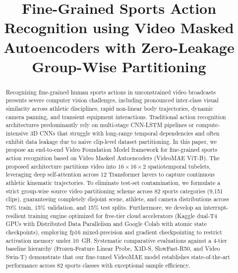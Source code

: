 \documentclass[conference]{IEEEtran}
\begin{document}
\title{Fine-Grained Sports Action Recognition using Video Masked Autoencoders with Zero-Leakage Group-Wise Partitioning}

\author{
}

\maketitle

\begin{abstract}
Recognizing fine-grained human sports actions in unconstrained video broadcasts presents severe computer vision challenges, including pronounced inter-class visual similarity across athletic disciplines, rapid non-linear body trajectories, dynamic camera panning, and transient equipment interactions. Traditional action recognition architectures predominantly rely on multi-stage CNN-LSTM pipelines or compute-intensive 3D CNNs that struggle with long-range temporal dependencies and often exhibit data leakage due to naive clip-level dataset partitioning. In this paper, we propose an end-to-end Video Foundation Model framework for fine-grained sports action recognition based on Video Masked Autoencoders (VideoMAE ViT-B). The proposed architecture partitions video into $16 \times 16 \times 2$ spatiotemporal tubelets, leveraging deep self-attention across 12 Transformer layers to capture continuous athletic kinematic trajectories. To eliminate test-set contamination, we formulate a strict group-wise source video partitioning scheme across 82 sports categories (9,151 clips), guaranteeing completely disjoint scene, athlete, and camera distributions across 70\% train, 15\% validation, and 15\% test splits. Furthermore, we develop an interrupt-resilient training engine optimized for free-tier cloud accelerators (Kaggle dual-T4 GPUs with Distributed Data Parallelism and Google Colab with atomic state checkpoints), employing fp16 mixed-precision and gradient checkpointing to restrict activation memory under 10~GB. Systematic comparative evaluations against a 4-tier baseline hierarchy (Frozen-Feature Linear Probe, X3D-S, SlowFast-R50, and Video Swin-T) demonstrate that our fine-tuned VideoMAE model establishes state-of-the-art performance across 82 sports classes with exceptional sample efficiency.
\end{abstract}
\end{document}
